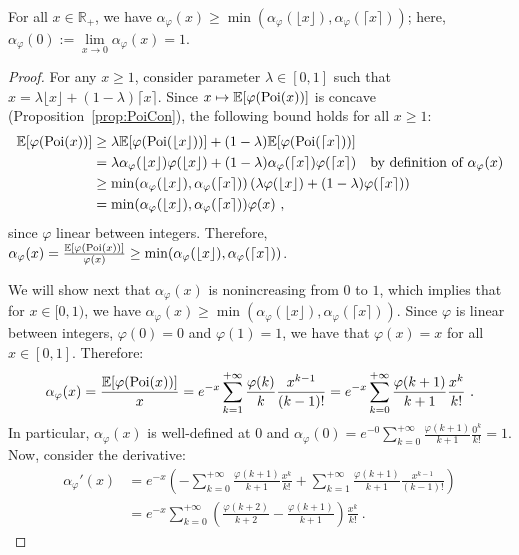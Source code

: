 \begin{proposition}
For all $x \in \mathbb{R}_+$, we have $\alpha_{\varphi}(x) \geq \min(\alpha_{\varphi}(\lfloor x \rfloor), \alpha_{\varphi}(\lceil x \rceil))$; here, $\alpha_{\varphi}(0) := \underset{x \rightarrow 0}{\lim} \alpha_{\varphi}(x) = 1$.
  \label{prop:minInt}
\end{proposition}
\begin{proof}
For any $x \geq 1$, consider parameter $\lambda \in [0,1]$ such that $x = \lambda \lfloor x \rfloor + (1-\lambda) \lceil x \rceil$. Since $x \mapsto \mathbb{E}[\varphi(\operatorname{\text{Poi}}(x))]$ is concave (Proposition~\ref{prop:PoiCon}), the following bound holds for all $x \geq 1$:
  \begin{equation}
    \begin{aligned}
      \mathbb{E}[\varphi(\operatorname{\text{Poi}}(x))] &\geq \lambda \mathbb{E}[\varphi(\operatorname{\text{Poi}}(\lfloor x \rfloor))] + (1-\lambda) \mathbb{E}[\varphi(\operatorname{\text{Poi}}(\lceil x \rceil))] \\      
      &=  \lambda \alpha_{\varphi}(\lfloor x \rfloor)\varphi(\lfloor x \rfloor) + (1-\lambda) \alpha_{\varphi}(\lceil x \rceil)\varphi(\lceil x \rceil) \quad \text{by definition of $\alpha_{\varphi}(x)$}\\
      &\geq \min(\alpha_{\varphi}(\lfloor x \rfloor), \alpha_{\varphi}(\lceil x \rceil)) \left(\lambda \varphi(\lfloor x \rfloor) + (1-\lambda) \varphi(\lceil x \rceil) \right)\\
      &=  \min(\alpha_{\varphi}(\lfloor x \rfloor), \alpha_{\varphi}(\lceil x \rceil)) \varphi(x) \ ,
    \end{aligned}
  \end{equation}
since $\varphi$ linear between integers. Therefore, $\alpha_{\varphi}(x) = \frac{\mathbb{E}[\varphi(\operatorname{\text{Poi}}(x))]}{\varphi(x)} \geq \min(\alpha_{\varphi}(\lfloor x \rfloor), \alpha_{\varphi}(\lceil x \rceil))$.


We will show next that $\alpha_{\varphi}(x)$ is nonincreasing from $0$ to $1$, which implies that for $x \in [0,1)$, we have $\alpha_{\varphi}(x) \geq  \min(\alpha_{\varphi}(\lfloor x \rfloor), \alpha_{\varphi}(\lceil x \rceil))$.
Since $\varphi$ is linear between integers, $\varphi(0) = 0$ and $\varphi(1) = 1$, we have that $\varphi(x) = x$ for all $x \in [0,1]$. Therefore: 
  \[\alpha_{\varphi}(x) = \frac{\mathbb{E}[\varphi(\Poi(x))]}{x} = e^{-x}\sum_{k=1}^{+\infty}\frac{\varphi(k)}{k}\frac{x^{k-1}}{(k-1)!} = e^{-x}\sum_{k=0}^{+\infty}\frac{\varphi(k+1)}{k+1}\frac{x^k}{k!} \ . \]
  In particular, $\alpha_{\varphi}(x)$ is well-defined at $0$ and $\alpha_{\varphi}(0) = e^{-0}\sum_{k=0}^{+\infty}\frac{\varphi(k+1)}{k+1}\frac{0^k}{k!} = 1$. Now, consider the derivative:
  \begin{equation}
    \begin{aligned}
    \alpha_{\varphi}'(x) &= e^{-x}\left(-\sum_{k=0}^{+\infty}\frac{\varphi(k+1)}{k+1}\frac{x^k}{k!} + \sum_{k=1}^{+\infty}\frac{\varphi(k+1)}{k+1}\frac{x^{k-1}}{(k-1)!} \right)\\
    &= e^{-x}\sum_{k=0}^{+\infty}\left(\frac{\varphi(k+2)}{k+2} - \frac{\varphi(k+1)}{k+1} \right)\frac{x^k}{k!} \ .
    \end{aligned}
  \end{equation}


\end{proof}
